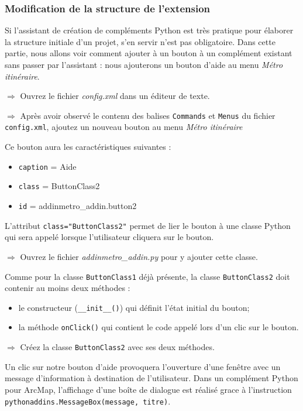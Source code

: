 \documentclass[11pt]{article}
\newcommand{\action}{$\Rightarrow$ }
\newcommand{\code}[1]{\lstinline{#1}}
\begin{document}
\subsubsection{Modification de la structure de l'extension}
Si l'assistant de création de compléments Python est très pratique pour élaborer la structure initiale d'un projet, s'en servir n'est pas obligatoire.
Dans cette partie, nous allons voir comment ajouter à un bouton à un complément existant sans passer par l'assistant : nous ajouterons un bouton d'aide au menu \textit{Métro itinéraire}.

\action Ouvrez le fichier \textit{config.xml} dans un éditeur de texte.

\action Après avoir observé le contenu des balises \code{Commands} et \code{Menus} du fichier \code{config.xml}, ajoutez un nouveau bouton au menu \textit{Métro itinéraire}

Ce bouton aura les caractéristiques suivantes :
\begin{itemize}
	\item \code{caption} = Aide
	\item \code{class} = ButtonClass2
	\item \code{id} = addinmetro\_addin.button2
\end{itemize}

L'attribut \code{class="ButtonClass2"} permet de lier le bouton à une classe Python qui sera appelé lorsque l'utilisateur cliquera sur le bouton.

\action Ouvrez le fichier \textit{addinmetro\_addin.py} pour y ajouter cette classe.

Comme pour la classe \code{ButtonClass1} déjà présente, la classe \code{ButtonClass2} doit contenir au moins deux méthodes :
\begin{itemize}
	\item le constructeur (\code{__init__()}) qui définit l'état initial du bouton;
	\item la méthode \code{onClick()} qui contient le code appelé lors d'un clic sur le bouton.
\end{itemize}

\action Créez la classe \code{ButtonClass2} avec ses deux méthodes.

Un clic sur notre bouton d'aide provoquera l'ouverture d'une fenêtre avec un message d'information à destination de l'utilisateur.
Dans un complément Python pour ArcMap, l'affichage d'une boîte de dialogue est réalisé grace à l'instruction \code{pythonaddins.MessageBox(message, titre)}.
\end{document}
